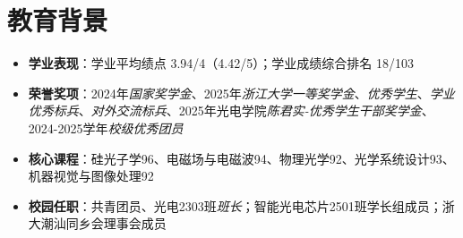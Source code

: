 \documentclass{resume}
\begin{document}
\small




\section{教育背景}






\begin{itemize} [parsep=1ex]
  \item \textbf{学业表现}：学业平均绩点 3.94/4（4.42/5）；学业成绩综合排名 18/103
  \item \textbf{荣誉奖项}：2024年\textit{国家奖学金}、2025年\textit{浙江大学一等奖学金}、\textit{优秀学生}、\textit{学业优秀标兵}、\textit{对外交流标兵}、2025年光电学院\textit{陈君实-优秀学生干部奖学金}、2024-2025学年\textit{校级优秀团员}
  \item \textbf{核心课程}：硅光子学96、电磁场与电磁波94、物理光学92、光学系统设计93、机器视觉与图像处理92
  \item \textbf{校园任职}：共青团员、光电2303班\textit{班长}；智能光电芯片2501班学长组成员；浙大潮汕同乡会理事会成员

\end{itemize}
\end{document}
